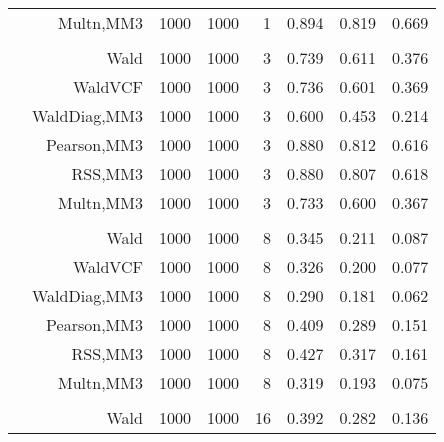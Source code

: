 \documentclass[
]{article}
\begin{document}
\begin{table}[H]
{\begin{tabular}[t]{lrrrrrrr}
\hspace{1em} & Multn,MM3 & 1000 & 1000 & 1 & 0.894 & 0.819 & 0.669\\
\cmidrule{1-8}
\addlinespace[0.3em]
\multicolumn{8}{l}{\textbf{1F 15V}}\\
\hspace{1em} & Wald & 1000 & 1000 & 3 & 0.739 & 0.611 & 0.376\\

\hspace{1em} & WaldVCF & 1000 & 1000 & 3 & 0.736 & 0.601 & 0.369\\

\hspace{1em} & WaldDiag,MM3 & 1000 & 1000 & 3 & 0.600 & 0.453 & 0.214\\

\hspace{1em} & Pearson,MM3 & 1000 & 1000 & 3 & 0.880 & 0.812 & 0.616\\

\hspace{1em} & RSS,MM3 & 1000 & 1000 & 3 & 0.880 & 0.807 & 0.618\\

\hspace{1em} & Multn,MM3 & 1000 & 1000 & 3 & 0.733 & 0.600 & 0.367\\
\cmidrule{1-8}
\addlinespace[0.3em]
\multicolumn{8}{l}{\textbf{2F 10V}}\\
\hspace{1em} & Wald & 1000 & 1000 & 8 & 0.345 & 0.211 & 0.087\\

\hspace{1em} & WaldVCF & 1000 & 1000 & 8 & 0.326 & 0.200 & 0.077\\

\hspace{1em} & WaldDiag,MM3 & 1000 & 1000 & 8 & 0.290 & 0.181 & 0.062\\

\hspace{1em} & Pearson,MM3 & 1000 & 1000 & 8 & 0.409 & 0.289 & 0.151\\

\hspace{1em} & RSS,MM3 & 1000 & 1000 & 8 & 0.427 & 0.317 & 0.161\\

\hspace{1em} & Multn,MM3 & 1000 & 1000 & 8 & 0.319 & 0.193 & 0.075\\
\cmidrule{1-8}
\addlinespace[0.3em]
\multicolumn{8}{l}{\textbf{3F 15V}}\\
\hspace{1em} & Wald & 1000 & 1000 & 16 & 0.392 & 0.282 & 0.136\\


\end{tabular}}
\end{table}
\end{document}

